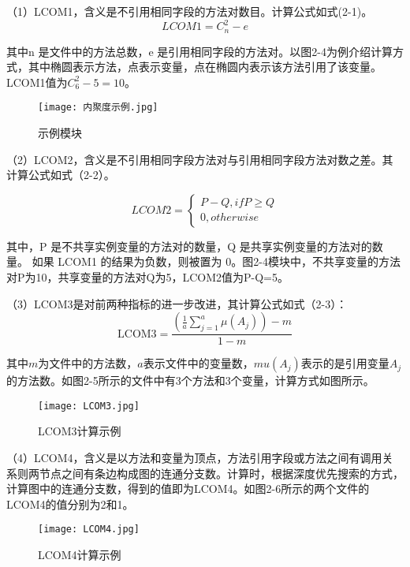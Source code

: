 （1）LCOM1，含义是不引用相同字段的方法对数目\cite{1994Ametr}。计算公式如式(2-1)。
\begin{equation}
LCOM1 = C_{n}^{2}-e
\end{equation}

其中n 是文件中的方法总数，e 是引用相同字段的方法对。以图2-4为例介绍计算方式，其中椭圆表示方法，点表示变量，点在椭圆内表示该方法引用了该变量。LCOM1值为\(C_{6}^{2} - 5 = 10\)。

\begin{figure}[h]
\centering
\texttt{[image: 内聚度示例.jpg]}
\caption{示例模块}
\end{figure}
    

（2）LCOM2，含义是不引用相同字段方法对与引用相同字段方法对数之差\cite{1996Coupling}。其计算公式如式（2-2）。

\begin{equation}
    {LCOM2}=\left\{
        \begin{array}
        {c}P-Q,  ifP\geq Q \\
        0,  otherwise
        \end{array}\right.
\end{equation}

其中，P 是不共享实例变量的方法对的数量，Q 是共享实例变量的方法对的数量。
如果 LCOM1 的结果为负数，则被置为 0。图2-4模块中，不共享变量的方法对P为10，共享变量的方法对Q为5，LCOM2值为P-Q=5。

（3）LCOM3是对前两种指标的进一步改进，其计算公式如式（2-3）：
\begin{equation}
\text{LCOM3} = \frac{\left( \frac{1}{a} \sum_{j=1}^a \mu(A_j) \right) - m}{1 - m}
\end{equation}

其中\( m\)为文件中的方法数，\( a\)表示文件中的变量数，\( mu(A_j)\)表示的是引用变量\(A_j\)的方法数。如图2-5所示的文件中有3个方法和3个变量，计算方式如图所示。
\begin{figure}[h]
\centering
\texttt{[image: LCOM3.jpg]}
\caption{LCOM3计算示例}
\end{figure}



（4）LCOM4，含义是以方法和变量为顶点，方法引用字段或方法之间有调用关系则两节点之间有条边构成图的连通分支数\cite{1995Measuring}。计算时，根据深度优先搜索的方式，计算图中的连通分支数，得到的值即为LCOM4。如图2-6所示的两个文件的LCOM4的值分别为2和1。

\begin{figure}[h]
\centering
\texttt{[image: LCOM4.jpg]}
\caption{LCOM4计算示例}
\end{figure}

